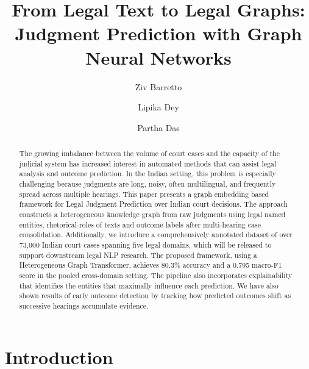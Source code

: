 \documentclass[runningheads]{llncs}
\begin{document}
\title{From Legal Text to Legal Graphs: Judgment Prediction with Graph Neural Networks}

\author{Ziv Barretto\and Lipika Dey\and Partha Das}


\maketitle

\begin{abstract}
The growing imbalance between the volume of court cases and the capacity of the judicial system has increased interest in automated methods that can assist legal analysis and outcome prediction. In the Indian setting, this problem is especially challenging because judgments are long, noisy, often multilingual, and frequently spread across multiple hearings. This paper presents a graph embedding based framework for Legal Judgment Prediction over Indian court decisions. The approach constructs a heterogeneous knowledge graph from raw judgments using legal named entities, rhetorical-roles of texts and outcome labels after multi-hearing case consolidation. Additionally, we introduce a comprehensively annotated dataset of over 73,000 Indian court cases spanning five legal domains, which will be released to support downstream legal NLP research. The proposed framework, using a Heterogeneous Graph Transformer, achieves 80.3\% accuracy and a 0.795 macro-F1 score in the pooled cross-domain setting. The pipeline also incorporates explainability that identifies the entities that maximally influence each prediction. We have also shown results of early outcome detection by tracking how predicted outcomes shift as successive hearings accumulate evidence.

\end{abstract}

\section{Introduction}
\label{sec:introduction}
\end{document}
